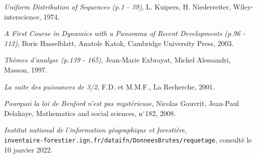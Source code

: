 \documentclass[11pt]{article}
\begin{document}
\begin{thebibliography}{99}

  \textit{Uniform Distribution of Sequences (p.1 - 39)},
  L. Kuipers, H. Niederreiter,
  Wiley-interscience,
  1974.

  \textit{A First Course in Dynamics with a Panorama of Recent Developments (p.96 - 112)},
  Boris Hasselblatt, Anatole Katok,
  Cambridge University Press,
  2003.
  
  \textit{Thèmes d'analyse (p.139 - 165)},
  Jean-Marie Exbrayat, Michel Alessandri,
  Masson,
  1997.

  \textit{La suite des puissances de 3/2},
  F.D. et M.M.F.,
  La Recherche,
  2001.
  
  \textit{Pourquoi la loi de Benford n'est pas mystérieuse},
  Nicolas Gauvrit, Jean-Paul Delahaye,
  Mathematics and social sciences, n$^\circ$182,
  2008.
    
  
  \textit{Institut national de l’information géographique et forestière},\\
  \texttt{inventaire-forestier.ign.fr/dataifn/DonneesBrutes/requetage},
  consulté le 10 janvier 2022.

\end{thebibliography}
\end{document}
